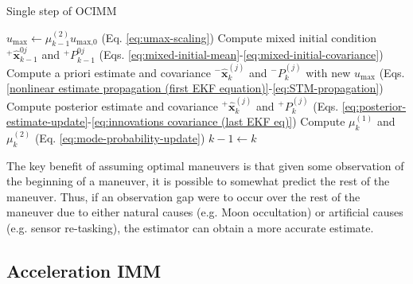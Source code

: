 \documentclass[letterpaper, preprint, paper,11pt]{AAS}	%
\begin{document}
\begin{algorithm}[H]
    \caption{Single step of OCIMM}
    \begin{algorithmic}
        \State $u_\text{max} \gets \mu_{k-1}^{(2)} u_\text{max,0}$ (Eq. \ref{eq:umax-scaling})
            \State Compute mixed initial condition ${}^+ \hat{\bm{x}}_{k-1}^{0j}$ and ${}^+P_{k-1}^{0j}$ (Eqs. \ref{eq:mixed-initial-mean}-\ref{eq:mixed-initial-covariance})
            \State Compute a priori estimate and covariance ${}^- \hat{\bm{x}}_k^{(j)}$ and ${}^-P_{k}^{(j)}$ with new $u_\text{max}$ (Eqs. \ref{nonlinear estimate propagation (first EKF equation)}-\ref{eq:STM-propagation})
            \State Compute posterior estimate and covariance ${}^+ \hat{\bm{x}}_k^{(j)}$ and ${}^+P_{k}^{(j)}$ (Eqs. \ref{eq:posterior-estimate-update}-\ref{eq:innovations covariance (last EKF eq)})
        \EndFor
        \State Compute $\mu_k^{(1)}$ and $\mu_k^{(2)}$ (Eq. \ref{eq:mode-probability-update})
        \State $k-1 \gets k$ 
    \end{algorithmic}
    \label{alg:OCIMM-step}
\end{algorithm}

The key benefit of assuming optimal maneuvers is that given some observation of the beginning of a maneuver, it is possible to somewhat predict the rest of the maneuver. Thus, if an observation gap were to occur over the rest of the maneuver due to either natural causes (e.g. Moon occultation) or artificial causes (e.g. sensor re-tasking), the estimator can obtain a more accurate estimate. 

\subsection{Acceleration IMM}
\end{document}
